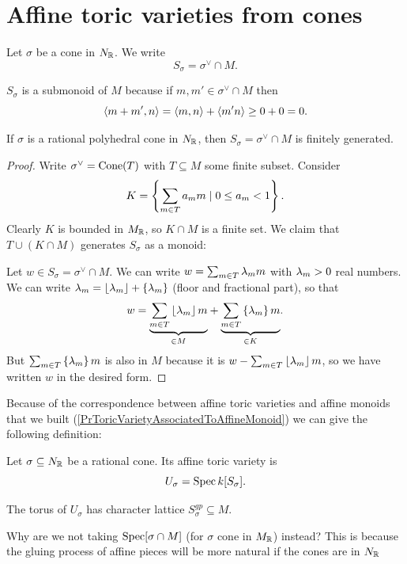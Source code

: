 \section{Affine toric varieties from cones}

\begin{notation}
Let $\sigma$ be a cone in $N_{\mathbb{R}}$. We write
\[S_\sigma=\sigma^\vee\cap M.\]
\end{notation}
\begin{remark}
$S_\sigma$ is a submonoid of $M$ because if $m,m'\in \sigma^\vee\cap M$ then
\[\left\langle {m+m',n}\right\rangle=\left\langle {m,n}\right\rangle+\left\langle {m'n}\right\rangle\geq 0+0=0.\]
\end{remark}

\begin{lemma}[Gordan]\label{LmGordan}
If $\sigma$ is a rational polyhedral cone in $N_{\mathbb{R}}$, then $S_\sigma=\sigma^\vee\cap M$ is finitely generated. 
\end{lemma}
\begin{proof}
Write $\sigma^\vee=\operatorname{Cone}(T)$ with $T\subseteq M$ some finite subset. Consider
\[K=\left\{{\sum_{m\in T}a_m m\mid 0\leq a_m<1}\right\}.\]
Clearly $K$ is bounded in $M_{\mathbb{R}}$, so $K\cap M$ is a finite set. We claim that $T\cup (K\cap M)$ generates $S_\sigma$ as a monoid:

Let $w\in S_\sigma=\sigma^\vee\cap M$. We can write $w=\sum_{m\in T}\lambda_m m$ with $\lambda_m>0$ real numbers. We can write $\lambda_m=\left\lfloor {\lambda_m}\right\rfloor+\left\{{\lambda_m}\right\}$ (floor and fractional part), so that
\[w=\underset{\in M}{\underbrace{\sum_{m\in T}\left\lfloor {\lambda_m}\right\rfloor m}}+\underset{\in K}{\underbrace{\sum_{m\in T}\left\{{\lambda_m}\right\}m}}.\]
But $\sum_{m\in T}\left\{{\lambda_m}\right\}m$ is also in $M$ because it is $w- \sum_{m\in T}\left\lfloor {\lambda_m}\right\rfloor m$, so we have written $w$ in the desired form.
\end{proof}

Because of the correspondence between affine toric varieties and affine monoids that we built (\ref{PrToricVarietyAssociatedToAffineMonoid}) we can give the following definition:

\begin{definition}[]
Let $\sigma\subseteq N_{\mathbb{R}}$ be a rational cone. Its affine toric variety is
\[U_\sigma=\operatorname{Spec} k[S_\sigma].\]
\end{definition}


\begin{remark}
The torus of $U_\sigma$ has character lattice $S_\sigma^{gp}\subseteq M$.
\end{remark}

\begin{remark}
Why are we not taking $\operatorname{Spec}[\sigma\cap M]$ (for $\sigma$ cone in $M_{\mathbb{R}}$) instead? This is because the gluing process of affine pieces will be more natural if the cones are in $N_{\mathbb{R}}$
\end{remark}

